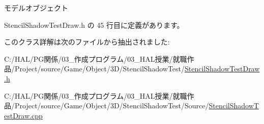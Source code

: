 モデルオブジェクト 



 Stencil\+Shadow\+Test\+Draw.\+h の 45 行目に定義があります。



このクラス詳解は次のファイルから抽出されました\+:\begin{DoxyCompactItemize}
\item 
C\+:/\+H\+A\+L/\+P\+G関係/03\+\_\+作成プログラム/03\+\_\+\+H\+A\+L授業/就職作品/\+Project/source/\+Game/\+Object/3\+D/\+Stencil\+Shadow\+Test/\mbox{\hyperlink{_stencil_shadow_test_draw_8h}{Stencil\+Shadow\+Test\+Draw.\+h}}\item 
C\+:/\+H\+A\+L/\+P\+G関係/03\+\_\+作成プログラム/03\+\_\+\+H\+A\+L授業/就職作品/\+Project/source/\+Game/\+Object/3\+D/\+Stencil\+Shadow\+Test/\+Source/\mbox{\hyperlink{_stencil_shadow_test_draw_8cpp}{Stencil\+Shadow\+Test\+Draw.\+cpp}}\end{DoxyCompactItemize}
